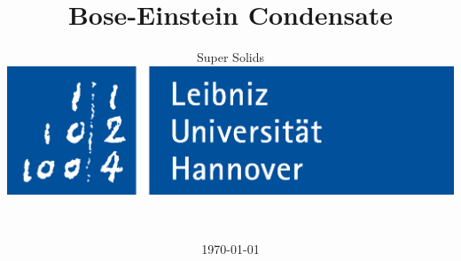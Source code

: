 \title{
Bose-Einstein Condensate
}
\subtitle{Super Solids %
\vspace{1cm}\\
 \includegraphics[width=.75\linewidth]{IMAGE/luh_logo.png}}
\author{
\authA\\
\matA
}
\date{\today}

\pagestyle{empty} %
\setcounter{page}{0} %
\maketitle %

\newpage
